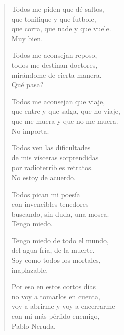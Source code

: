 \documentclass[12pt]{article}
\begin{document}
\clearpage
{}
\begin{verse}

Todos me piden que dé saltos,\\
que tonifique y que futbole,\\
que corra, que nade y que vuele.\\
Muy bien.  

Todos me aconsejan reposo,\\
todos me destinan doctores,\\
mirándome de cierta manera.\\
Qué pasa?  

Todos me aconsejan que viaje,\\
que entre y que salga, que no viaje,\\
que me muera y que no me muera.\\
No importa.  

Todos ven las dificultades\\
de mis vísceras sorprendidas\\
por radioterribles retratos.\\
No estoy de acuerdo.  

Todos pican mi poesía\\
con invencibles tenedores\\
buscando, sin duda, una mosca.\\
Tengo miedo.  

Tengo miedo de todo el mundo,\\
del agua fría, de la muerte.\\
Soy como todos los mortales,\\
inaplazable.  

Por eso en estos cortos días\\
no voy a tomarlos en cuenta,\\
voy a abrirme y voy a encerrarme\\
con mi más pérfido enemigo,\\
Pablo Neruda.  

\end{verse}
\end{document}
